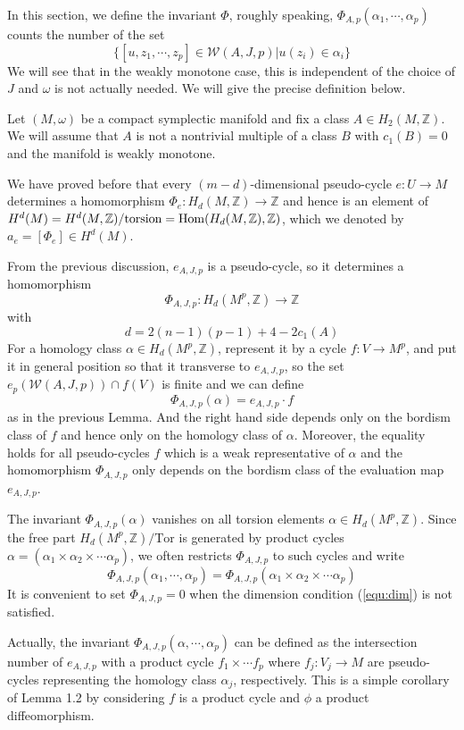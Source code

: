 \documentclass[twoside]{article}
\begin{document}
In this section, we define the invariant $\Phi$, roughly speaking, 
$\Phi_{A,p}(\alpha_1,\cdots,\alpha_p)$ counts the number of the set
\[\{[u,z_1,\cdots,z_p]\in\mathscr{W}(A,J,p)|u(z_i)\in \alpha_i    \}\]
We will see that in the weakly monotone case, 
this is independent of the choice of $J$ and $\omega$ is not actually needed. 
We will give the precise definition below.

Let $(M,\omega)$ be a compact symplectic manifold and fix a class $A\in H_2(M,\mathbb{Z})$. 
We will assume that $A$ is not a nontrivial multiple 
of a class $B$ with $c_1(B)=0$ and the manifold is weakly monotone.

We have proved before that every $(m-d)$-dimensional pseudo-cycle $e\colon U\rightarrow M$ 
determines a homomorphism $\Phi_e\colon H_d(M,\mathbb{Z})\rightarrow \mathbb{Z}$ and hence 
is an element of $H^d(M)=H^d(M,\mathbb{Z})/\textrm{torsion}=\operatorname{Hom}(H_d(M,\mathbb{Z}),\mathbb{Z})$, 
which we denoted by $a_e=[\Phi_e]\in H^d(M)$.

From the previous discussion, $e_{A,J,p}$ is a pseudo-cycle, so it determines a homomorphism
\[\Phi_{A,J,p}\colon H_d(M^p,\mathbb{Z})\rightarrow \mathbb{Z}\]
with 
\begin{equation}\label{equ:dim}
    d=2(n-1)(p-1)+4-2c_1(A)
\end{equation}
For a homology class $\alpha\in H_d(M^p,\mathbb{Z})$, represent it by a cycle $f\colon V\rightarrow M^p$, 
and put it in general position so that it transverse to $e_{A,J,p}$, 
so the set $e_p(\mathscr{W}(A,J,p))\cap f(V)$ is finite and we can define
\[\Phi_{A,J,p}(\alpha)=e_{A,J,p}\cdot f\]
as in the previous Lemma. 
And the right hand side depends only on the bordism class of $f$ and hence only on the homology class of $\alpha$. 
Moreover, the equality holds for all pseudo-cycles $f$ 
which is a weak representative of $\alpha$ and the homomorphism $\Phi_{A,J,p}$ 
only depends on the bordism class of the evaluation map $e_{A,J,p}$.

The invariant $\Phi_{A,J,p}(\alpha)$ vanishes on all torsion elements $\alpha\in H_d(M^p,\mathbb{Z})$. 
Since the free part $H_d(M^p,\mathbb{Z})/\textrm{Tor}$ is generated by 
product cycles $\alpha=(\alpha_1\times\alpha_2\times\cdots \alpha_p)$, 
we often restricts $\Phi_{A,J,p}$ to such cycles and write
\[\Phi_{A,J,p}(\alpha_1,\cdots,\alpha_p)=\Phi_{A,J,p}(\alpha_1\times\alpha_2\times\cdots \alpha_p)\]
It is convenient to set $\Phi_{A,J,p}=0$ when the dimension condition (\ref{equ:dim}) is not satisfied.

\begin{remark}
Actually, the invariant $\Phi_{A,J,p}(\alpha,\cdots,\alpha_p)$ can be defined as 
the intersection number of $e_{A,J,p}$ with a product cycle $f_1\times\cdots f_p$ 
where $f_j\colon V_j\rightarrow M$ are pseudo-cycles representing the homology class $\alpha_j$, respectively. 
This is a simple corollary of Lemma 1.2 by considering $f$ is a product cycle and $\phi$ a product diffeomorphism.
\end{remark}
\end{document}
